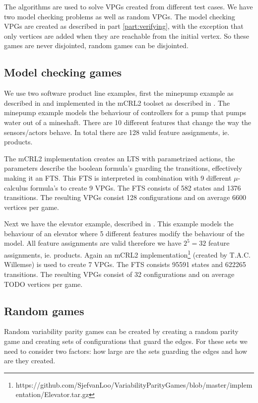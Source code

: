 The algorithms are used to solve VPGs created from different test cases. We have two model checking problems as well as random VPGs. The model checking VPGs are created as described in part \ref{part:verifying}, with the exception that only vertices are added when they are reachable from the initial vertex. So these games are never disjointed, random games can be disjointed.

\subsection{Model checking games}
We use two software product line examples, first the minepump example as described in \cite{Kramer1983CONICAI} and implemented in the mCRL2 toolset as described in \cite{FamBasedModelCheckingWithMCRL2}. The minepump example models the behaviour of controllers for a pump that pumps water out of a mineshaft. There are 10 different features that change the way the sensors/actors behave. In total there are 128 valid feature assignments, ie. products. 

The mCRL2 implementation creates an LTS with parametrized actions, the parameters describe the boolean formula's guarding the transitions, effectively making it an FTS. This FTS is interpreted in combination with 9 different $\mu$-calculus formula's to create 9 VPGs. The FTS consists of 582 states and 1376 transitions. The resulting VPGs consist 128 configurations and on average 6600 vertices per game.

Next we have the elevator example, described in \cite{PLATH200153}. This example models the behaviour of an elevator where 5 different features modify the behaviour of the model. All feature assignments are valid therefore we have $2^5 = 32$ feature assignments, ie. products. Again an mCRL2 implementation\footnote{\label{note1}https://github.com/SjefvanLoo/VariabilityParityGames/blob/master/implementation/Elevator.tar.gz} (created by T.A.C. Willemse) is used to create 7 VPGs. The FTS consists 95591 states and 622265 transitions. The resulting VPGs consist of 32 configurations and on average TODO vertices per game. 
\subsection{Random games}
Random variability parity games can be created by creating a random parity game and creating sets of configurations that guard the edges. For these sets we need to consider two factors: how large are the sets guarding the edges and how are they created.

